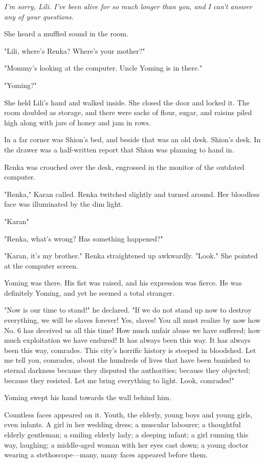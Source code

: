 \emph{I'm sorry, Lili. I've been alive for so much longer than you, and I
can't answer any of your questions.}

She heard a muffled sound in the room.

"Lili, where's Renka? Where's your mother?"

"Mommy's looking at the computer. Uncle Yoming is in there."

"Yoming?"

She held Lili's hand and walked inside. She closed the door and locked
it. The room doubled as storage, and there were sacks of flour, sugar,
and raisins piled high along with jars of honey and jam in rows.

In a far corner was Shion's bed, and beside that was an old desk.
Shion's desk. In the drawer was a half-written report that Shion was
planning to hand in.

Renka was crouched over the desk, engrossed in the monitor of the
outdated computer.

"Renka," Karan called. Renka twitched slightly and turned around. Her
bloodless face was illuminated by the dim light.

"Karan\el "

"Renka, what's wrong? Has something happened?"

"Karan, it's my brother." Renka straightened up awkwardly. "Look." She
pointed at the computer screen.

Yoming was there. His fist was raised, and his expression was fierce. He
was definitely Yoming, and yet he seemed a total stranger.

"Now is our time to stand!" he declared. "If we do not stand up now to
destroy everything, we will be slaves forever! Yes, slaves! You all must
realize by now how No. 6 has deceived us all this time! How much unfair
abuse we have suffered; how much exploitation we have endured! It has
always been this way. It has always been this way, comrades. This city's
horrific history is steeped in bloodshed. Let me tell you, comrades,
about the hundreds of lives that have been banished to eternal darkness
because they disputed the authorities; because they objected; because
they resisted. Let me bring everything to light. Look, comrades!"

Yoming swept his hand towards the wall behind him.

Countless faces appeared on it. Youth, the elderly, young boys and young
girls, even infants. A girl in her wedding dress; a muscular labourer; a
thoughtful elderly gentleman; a smiling elderly lady; a sleeping infant;
a girl running this way, laughing; a middle-aged woman with her eyes
cast down; a young doctor wearing a stethoscope---many, many faces
appeared before them.

